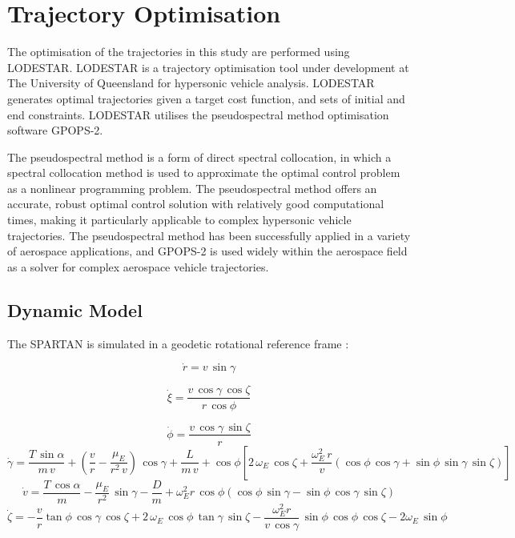 \documentclass[conf]{new-aiaa}
\begin{document}
\section{Trajectory Optimisation}
The optimisation of the trajectories in this study are performed using LODESTAR. LODESTAR is a trajectory optimisation tool under development at The University of Queensland for hypersonic vehicle analysis. LODESTAR generates optimal trajectories given a target cost function, and sets of initial and end constraints. LODESTAR utilises the pseudospectral method optimisation software GPOPS-2\cite{Patterson2015}. 

The pseudospectral method is a form of direct spectral collocation, in which a spectral collocation method is used to approximate the optimal control problem as a nonlinear programming problem. The pseudospectral method offers an accurate, robust optimal control solution with relatively good computational times, making it particularly applicable to complex hypersonic vehicle trajectories.  The pseudospectral method has been successfully applied in a variety of aerospace applications, and GPOPS-2 is used widely within the aerospace field as a solver for complex aerospace vehicle trajectories.


\subsection{Dynamic Model}

The SPARTAN is simulated in a geodetic rotational reference frame \cite{Josselyn2002a}: 

\begin{equation}
\dot{r} = v \, \sin \gamma
\end{equation}

\begin{equation}
\dot{\xi} = \frac{v \, \cos \gamma \, \cos \zeta}{r \, \cos \phi}
\end{equation}

\begin{equation}
\dot{\phi} = \frac{v\,\cos\gamma\,\sin\zeta}{r}
\end{equation}
\begin{equation}
\dot{\gamma} = \frac{T\,\sin\alpha}{m\,v}+ (\frac{v}{r}-\frac{\mu_E}{r^2 \,v})\,\cos\gamma + \frac{L}{m\,v}
+ \cos\phi[2\,\omega_E\, \cos\zeta + \frac{\omega_E^2\, r}{v}(\cos\phi\,\cos\gamma+\sin\phi\,\sin\gamma\,\sin\zeta)]
\end{equation}
\begin{equation}
\dot{v} = \frac{T\,\cos\alpha}{m}-\frac{\mu_E}{r^2}\,\sin\gamma - \frac{D}{m}
+ \omega_E^2 r\,\cos\phi(\cos\phi\,\sin\gamma-\sin\phi\,\cos\gamma\,\sin\zeta)
\end{equation}
\begin{equation}
\dot{\zeta} = -\frac{v}{r}\tan\phi\,\cos\gamma\,\cos\zeta +2\,\omega_E\,\cos\phi\,\tan\gamma\,\sin\zeta - \frac{\omega_E^2 r}{v\,\cos\gamma}\,\sin\phi \, \cos\phi\,\cos\zeta-2\omega_E\,\sin\phi 
\end{equation}
\end{document}
